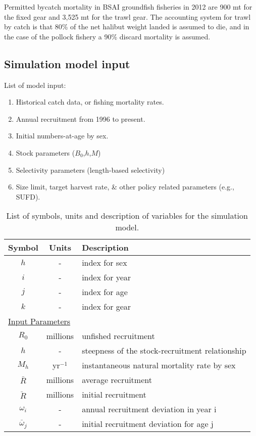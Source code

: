 Permitted bycatch mortality in BSAI groundfish fisheries in 2012 are 900 mt for the fixed gear and 3,525 mt for the trawl gear.  The accounting system for trawl by catch is that 80\% of the net halibut weight landed is assumed to die, and in the case of the pollock fishery a 90\% discard mortality is assumed.

\subsection{Simulation model input} %
\label{sub:simulation_model_input}

List of model input:
\begin{enumerate}
	\item Historical catch data, or fishing mortality rates.
	\item Annual recruitment from 1996 to present.
	\item Initial numbers-at-age by sex.
	\item Stock parameters ($B_0$,$h$,$M$)
	\item Selectivity parameters (length-based selectivity)
	\item Size limit, target harvest rate, \& other policy related parameters (e.g., SUFD).
\end{enumerate}

\begin{table}[ht]
	\caption{List of symbols, units and description of variables for the simulation model.}
	\label{tab:ListOfSymbols}
	\begin{center}
	\begin{tabular}{ccl}
		\hline
		Symbol & Units & Description \\
		\hline
		$h$	& - & index for sex\\
		$i$	& - & index for year\\
		$j$	& - & index for age\\
		$k$	& - & index for gear\\
		\multicolumn{3}{l}{\underline{Input Parameters}}\\
		$R_0$	& millions	& unfished recruitment\\
		$h$		& -			& steepness of the stock-recruitment relationship\\
		$M_h$	& yr$^{-1}$	& instantaneous natural mortality rate by sex \\
		$\bar{R}$ & millions & average recruitment\\
		$\ddot{R}$ & millions & initial recruitment\\
		$\omega_i$ & - & annual recruitment deviation in year i\\
		$\ddot{\omega_j}$ & - & initial recruitment deviation for age j\\
		\hline
	\end{tabular}
	\end{center}
\end{table}

